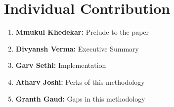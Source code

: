 \documentclass{article}
\begin{document}
\section*{Individual Contribution}
\begin{enumerate}
    \item \textbf{Mmukul Khedekar:} Prelude to the paper 
    \item \textbf{Divyansh Verma: } Executive Summary 
    \item \textbf{Garv Sethi:}  Implementation
    \item \textbf{Atharv Joshi: } Perks of this methodology
    \item \textbf{Granth Gaud: } Gaps in this methodology
     
\end{enumerate}


\end{document}
